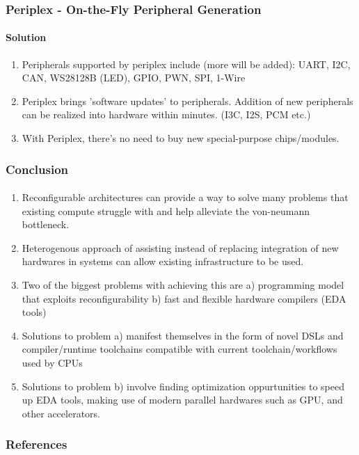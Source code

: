 \documentclass{beamer}
\begin{document}
{\begin{frame}[fragile]
  \frametitle{Periplex - On-the-Fly Peripheral Generation}
  \framesubtitle{Solution}
  \begin{enumerate}
     \item Peripherals supported by periplex include (more will be added):
       UART, I2C, CAN, WS28128B (LED), GPIO, PWN, SPI, 1-Wire
     \item Periplex brings 'software updates' to peripherals. Addition of new
       peripherals can be realized into hardware within minutes. (I3C, I2S,
       PCM etc.)
     \item With Periplex, there's no need to buy new special-purpose
       chips/modules.
  \end{enumerate}
\end{frame}

\begin{frame}[fragile]
  \frametitle{Conclusion}
  \framesubtitle{}

  \begin{enumerate}
    \item Reconfigurable architectures can provide a way to solve many problems
      that existing compute struggle with and help alleviate the von-neumann
      bottleneck.
    \item Heterogenous approach of assisting instead of replacing integration of
      new hardwares in systems can allow existing infrastructure to be used.
    \item Two of the biggest problems with achieving this are a) programming
      model that exploits reconfigurability b) fast and flexible hardware
      compilers (EDA tools)
    \item Solutions to problem a) manifest themselves in the form of novel DSLs
      and compiler/runtime toolchains compatible with current
      toolchain/workflows used by CPUs
    \item Solutions to problem b) involve finding optimization oppurtunities
      to speed up EDA tools, making use of modern parallel hardwares such as
      GPU, and other accelerators.
  \end{enumerate}
\end{frame}

\begin{frame}[allowframebreaks]
\frametitle{References}
\printbibliography
\end{frame}

}
\end{document}
